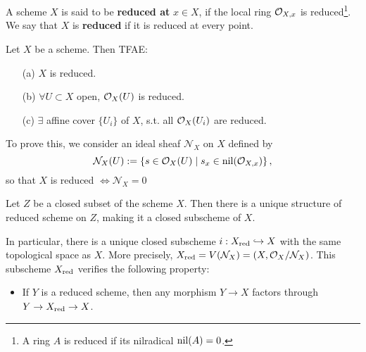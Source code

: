 A scheme $X$ is said to be \textbf{reduced at} $x\in X$,
if the local ring $\mathcal{O}_{X, x}$ is reduced\footnote{
    A ring $A$ is reduced if its nilradical
$\operatorname{nil}(A) = 0$.
}.
We say that $X$ is \textbf{reduced} if it is reduced at every point.

\begin{proposition}\label{reduced is Zariski local}
    Let $X$ be a scheme. Then TFAE:
    \begin{enumerate}
    \item [(a)] $X$ is reduced.
    \item [(b)] $\forall U\subset X$ open, $\mathcal{O}_X(U)$ is reduced.
    \item [(c)] $\exists$ affine cover $\{U_i\}$ of $X$, s.t. all $\mathcal{O}_X(U_i)$ are reduced.
    \end{enumerate}
\end{proposition}

To prove this, we consider an ideal sheaf $\mathcal{N}_X$ on $X$ defined by
\[\mathcal{N}_X(U) := \left\{s\in \mathcal{O}_X(U)\mid s_x\in\operatorname{nil}(\mathcal{O}_{X, x})\right\},\]
so that $X$ is reduced $\iff\mathcal{N}_X = 0$


\begin{proposition}\label{reduced subscheme structure on closed subset}
    Let $Z$ be a closed subset of the scheme $X$.
    Then there is a unique structure of reduced scheme on $Z$, making it a closed subscheme of $X$.

    In particular, there is a unique closed subscheme $i : X_{\operatorname{red}}\hookrightarrow X$
    with the same topological space as $X$.
    More precisely, $X_{\operatorname{red}} = V(\mathcal{N}_X) = (X, \mathcal{O}_X/\mathcal{N}_X)$.
    This subscheme $X_{\operatorname{red}}$ verifies the following property:
    \begin{itemize}
        \item If $Y$ is a reduced scheme,
        then any morphism $Y\to X$ factors through $Y\to X_{\operatorname{red}}\to X$.
    \end{itemize}
\end{proposition}

